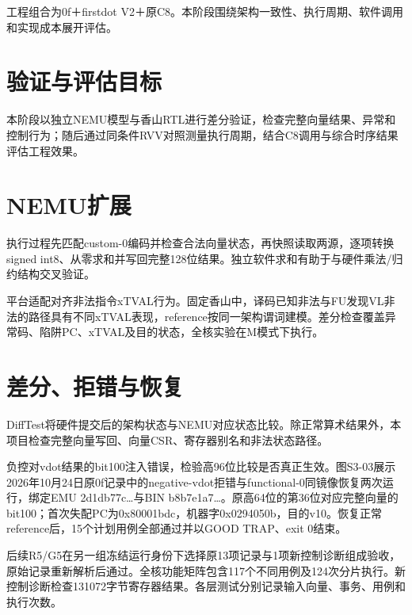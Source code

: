

工程组合为0f＋firstdot V2＋原C8。本阶段围绕架构一致性、执行周期、软件调用和实现成本展开评估。\par


\section{验证与评估目标}


本阶段以独立NEMU模型与香山RTL进行差分验证，检查完整向量结果、异常和控制行为；随后通过同条件RVV对照测量执行周期，结合C8调用与综合时序结果评估工程效果。\par


\section{NEMU扩展}





执行过程先匹配custom-0编码并检查合法向量状态，再快照读取两源，逐项转换signed int8、从零求和并写回完整128位结果。独立软件求和有助于与硬件乘法/归约结构交叉验证。\par


平台适配对齐非法指令xTVAL行为。固定香山中，译码已知非法与FU发现VL非法的路径具有不同xTVAL表现，reference按同一架构谓词建模。差分检查覆盖异常码、陷阱PC、xTVAL及目的状态，全核实验在M模式下执行。\par


\section{差分、拒错与恢复}


DiffTest将硬件提交后的架构状态与NEMU对应状态比较。除正常算术结果外，本项目检查完整向量写回、向量CSR、寄存器别名和非法状态路径。\par


负控对vdot结果的bit100注入错误，检验高96位比较是否真正生效。图S3-03展示2026年10月24日原0f记录中的negative-vdot拒错与functional-0同镜像恢复两次运行，绑定EMU 2d1db77c…与BIN b8b7e1a7…。原高64位的第36位对应完整向量的bit100；首次失配PC为0x80001bdc，机器字0x0294050b，目的v10。恢复正常reference后，15个计划用例全部通过并以GOOD TRAP、exit 0结束。\par


后续R5/G5在另一组冻结运行身份下选择原13项记录与1项新控制诊断组成验收，原始记录重新解析后通过。全核功能矩阵包含117个不同用例及124次分片执行。新控制诊断检查131072字节寄存器结果。各层测试分别记录输入向量、事务、用例和执行次数。\par




